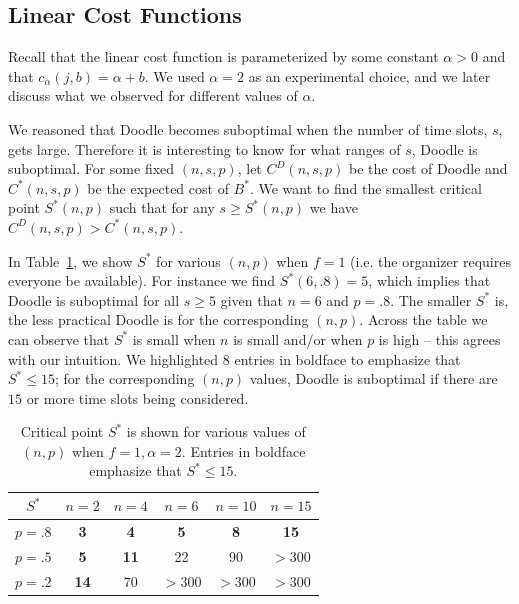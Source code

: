 
\subsection{Linear Cost Functions} \label{bdoodle:sec:result_linear_cost}
Recall that the linear cost function is parameterized by some constant $\alpha>0$ and that $c_{\alpha}(j, b) = \alpha + b$. We used $\alpha = 2$ as an experimental choice, and we later discuss what we observed for different values of $\alpha$.

We reasoned that Doodle becomes suboptimal when the number of time slots, $s$, gets large. Therefore it is interesting to know for what ranges of $s$, Doodle is suboptimal. For some fixed $(n, s, p)$, let $C^D(n, s, p)$ be the cost of Doodle and $C^*(n, s, p)$ be the expected cost of $B^*$. We want to find the smallest critical point $S^*(n, p)$ such that for any $s \geq S^*(n, p)$ we have $C^D(n, s, p) > C^*(n, s, p)$. 

In Table~\ref{bdoodle:table:DoodleSuboptimal}, we show $S^*$ for various $(n, p)$ when $f = 1$ (i.e. the organizer requires everyone be available). For instance we find $S^*(6, .8) = 5$, which implies that Doodle is suboptimal for all $s \geq 5$ given that $n=6$ and $p=.8$. The smaller $S^*$ is, the less practical Doodle is for the corresponding $(n, p)$. 
Across the table we can observe that $S^*$ is small when $n$ is small and/or when $p$ is high -- this agrees with our intuition.  
We highlighted $8$ entries in boldface to emphasize that $S^* \leq 15$; for the corresponding $(n, p)$ values, Doodle is suboptimal if there are $15$ or more time slots being considered.
\begin{table}[h!]  
	\small
\centering
\begin{tabular}{|c|c|c|c|c|c|}
	\hline
	$S^*$ & $n = 2$ & $n = 4$ & $n = 6$ & $ n = 10 $ & $n = 15$ \\ \hline
	$p = .8$ & \textbf{3} & \textbf{4} & \textbf{5} & \textbf{8} & \textbf{15} \\ \hline
	$p = .5$ & \textbf{5} & \textbf{11} & 22 & 90 & $>300$\\ \hline
	$p = .2$ & \textbf{14} & 70 & $>300$ & $>300$ & $>300$ \\ \hline	
\end{tabular}
\caption{Critical point $S^*$ is shown for various values of $(n, p)$ when $f = 1, \alpha = 2$. Entries in boldface emphasize that $S^* \leq 15$.} \label{bdoodle:table:DoodleSuboptimal}
\end{table}

